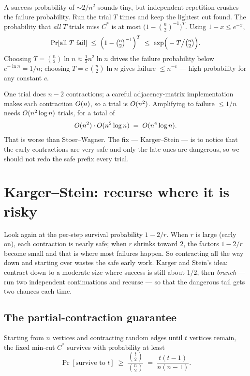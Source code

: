 A success probability of $\sim 2/n^2$ sounds tiny, but independent repetition crushes the failure probability. Run the trial $T$ times and keep the lightest cut found. The probability that \emph{all} $T$ trials miss $C^\ast$ is at most $\big(1-\binom{n}{2}^{-1}\big)^T$. Using $1-x\le e^{-x}$,
\[
  \Pr[\text{all }T\text{ fail}] \;\le\; \Big(1-\tbinom{n}{2}^{-1}\Big)^{T}
  \;\le\; \exp\!\Big(-T\big/\tbinom{n}{2}\Big).
\]
Choosing $T = \binom{n}{2}\ln n \approx \tfrac12 n^2\ln n$ drives the failure probability below $e^{-\ln n}=1/n$; choosing $T=c\,\binom{n}{2}\ln n$ gives failure $\le n^{-c}$ --- high probability for any constant $c$.

\begin{complexitybox}
One trial does $n-2$ contractions; a careful adjacency-matrix implementation makes each contraction $O(n)$, so a trial is $O(n^2)$. Amplifying to failure $\le 1/n$ needs $O(n^2\log n)$ trials, for a total of
\[
  O(n^2)\cdot O(n^2\log n) \;=\; O(n^4\log n).
\]
That is worse than Stoer--Wagner. The fix --- Karger--Stein --- is to notice that the early contractions are very safe and only the late ones are dangerous, so we should not redo the safe prefix every trial.
\end{complexitybox}

\section{Karger--Stein: recurse where it is risky}

Look again at the per-step survival probability $1-2/r$. When $r$ is large (early on), each contraction is nearly safe; when $r$ shrinks toward $2$, the factors $1-2/r$ become small and that is where most failures happen. So contracting all the way down and starting over wastes the safe early work. Karger and Stein's idea: contract down to a moderate size where success is still about $1/2$, then \emph{branch} --- run two independent continuations and recurse --- so that the dangerous tail gets two chances each time.

\subsection{The partial-contraction guarantee}

\begin{lemma}\label{ch11:lem-survive}
Starting from $n$ vertices and contracting random edges until $t$ vertices remain, the fixed min-cut $C^\ast$ survives with probability at least
\[
  \Pr[\text{survive to }t] \;\ge\; \frac{\binom{t}{2}}{\binom{n}{2}} \;=\; \frac{t(t-1)}{n(n-1)}.
\]
\end{lemma}

